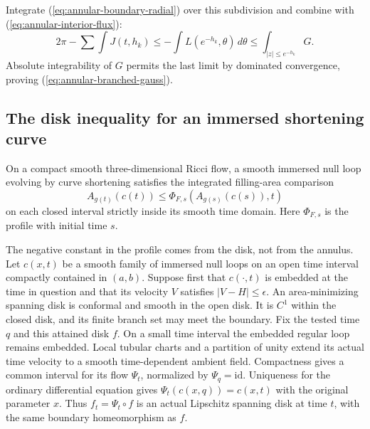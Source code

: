 Integrate (\ref{eq:annular-boundary-radial}) over this subdivision
and combine with (\ref{eq:annular-interior-flux}):
\[
 2\pi-\sum\int J(t,h_k)
       \le-\int L(e^{-h_k},\theta)\,d\theta
       \le\int_{|z|\le e^{-h_k}}G.
\]
Absolute integrability of $G$ permits the last limit by dominated
convergence, proving (\ref{eq:annular-branched-gauss}).

\subsection{The disk inequality for an immersed shortening curve}
\label{sec:immersed-disk-comparison}

\begin{lemma}
\label{lem:annular-immersed-disk}
On a compact smooth three-dimensional Ricci flow, a smooth immersed
null loop evolving by curve shortening satisfies the integrated
filling-area comparison
\[
 A_{g(t)}(c(t))\leq\Phi_{F,s}(A_{g(s)}(c(s)),t)
\]
on each closed interval strictly inside its smooth time domain.
Here $\Phi_{F,s}$ is the profile with initial time $s$.
\end{lemma}

The negative constant in the profile comes from the disk, not from the
annulus.  Let $c(x,t)$ be a smooth family of immersed null loops on an
open time interval compactly contained in $(a,b)$.  Suppose first that
$c(\cdot,t)$ is embedded at the time in question and that its velocity
$V$ satisfies $|V-H|\le\epsilon$.  An area-minimizing spanning disk is
conformal and smooth in the open disk. It is $C^1$ within the closed
disk, and its finite branch set may meet the boundary.
Fix the tested time $q$ and this attained disk $f$.  On a small
time interval the embedded regular loop remains embedded.
Local tubular charts and a partition of unity extend its actual
time velocity to a smooth time-dependent ambient field.
Compactness gives a common interval for its flow $\Psi_t$,
normalized by $\Psi_q=\mathrm{id}$.  Uniqueness for the ordinary
differential equation gives
$\Psi_t(c(x,q))=c(x,t)$ with the original parameter $x$.
Thus $f_t=\Psi_t\circ f$ is an actual Lipschitz spanning disk
at time $t$, with the same boundary homeomorphism as $f$.

